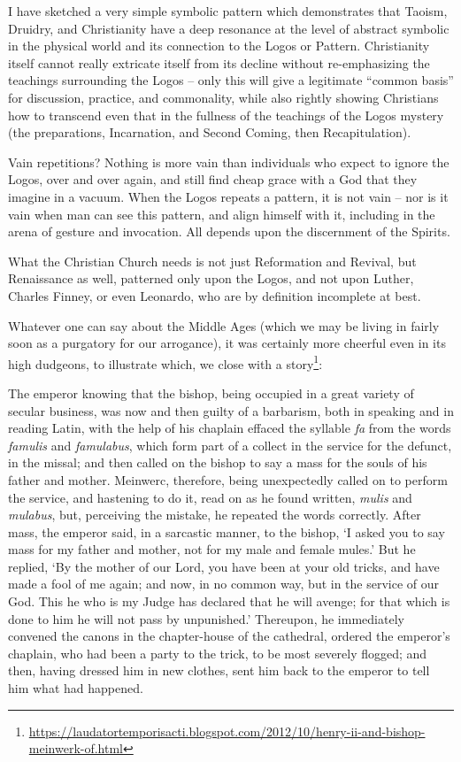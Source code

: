 I have sketched a very simple symbolic pattern which demonstrates that Taoism, Druidry, and Christianity have a deep resonance at the level of abstract symbolic in the physical world and its connection to the Logos or Pattern. Christianity itself cannot really extricate itself from its decline without re-emphasizing the teachings surrounding the Logos -- only this will give a legitimate ``common basis'' for discussion, practice, and commonality, while also rightly showing Christians how to transcend even that in the fullness of the teachings of the Logos mystery (the preparations, Incarnation, and Second Coming, then Recapitulation).

Vain repetitions? Nothing is more vain than individuals who expect to ignore the Logos, over and over again, and still find cheap grace with a God that they imagine in a vacuum. When the Logos repeats a pattern, it is not vain -- nor is it vain when man can see this pattern, and align himself with it, including in the arena of gesture and invocation. All depends upon the discernment of the Spirits.

What the Christian Church needs is not just Reformation and Revival, but Renaissance as well, patterned only upon the Logos, and not upon Luther, Charles Finney, or even Leonardo, who are by definition incomplete at best.

Whatever one can say about the Middle Ages (which we may be living in fairly soon as a purgatory for our arrogance), it was certainly more cheerful even in its high dudgeons, to illustrate which, we close with a story\footnote{\url{https://laudatortemporisacti.blogspot.com/2012/10/henry-ii-and-bishop-meinwerk-of.html}}:

\begin{quotex}
The emperor knowing that the bishop, being occupied in a great variety of secular business, was now and then guilty of a barbarism, both in speaking and in reading Latin, with the help of his chaplain effaced the syllable \emph{fa} from the words \emph{famulis} and \emph{famulabus}, which form part of a collect in the service for the defunct, in the missal; and then called on the bishop to say a mass for the souls of his father and mother. Meinwerc, therefore, being unexpectedly called on to perform the service, and hastening to do it, read on as he found written, \emph{mulis} and \emph{mulabus}, but, perceiving the mistake, he repeated the words correctly. After mass, the emperor said, in a sarcastic manner, to the bishop, `I asked you to say mass for my father and mother, not for my male and female mules.' But he replied, `By the mother of our Lord, you have been at your old tricks, and have made a fool of me again; and now, in no common way, but in the service of our God. This he who is my Judge has declared that he will avenge; for that which is done to him he will not pass by unpunished.' Thereupon, he immediately convened the canons in the chapter-house of the cathedral, ordered the emperor's chaplain, who had been a party to the trick, to be most severely flogged; and then, having dressed him in new clothes, sent him back to the emperor to tell him what had happened.
\end{quotex}



